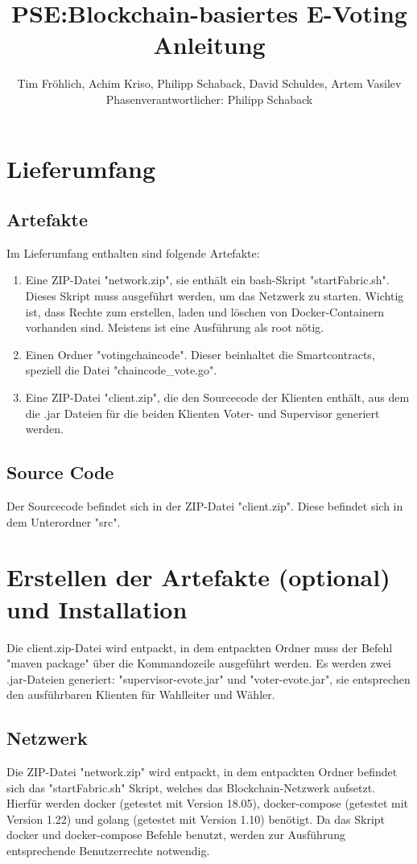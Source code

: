 \documentclass[parskip=full]{scrartcl}
\title{
	PSE:Blockchain-basiertes E-Voting \\
	Anleitung
}
\author{Tim Fröhlich, Achim Kriso, Philipp Schaback, David Schuldes, Artem Vasilev\\ Phasenverantwortlicher: Philipp Schaback}
\begin{document}
	\clearpage
	\maketitle
	\newpage
	
	\tableofcontents
	\newpage
	
	\section{Lieferumfang}
	\subsection{Artefakte}
	Im Lieferumfang enthalten sind folgende Artefakte:
	\begin{enumerate}
		\item Eine ZIP-Datei "network.zip", sie enthält ein bash-Skript "startFabric.sh". Dieses Skript muss ausgeführt werden, um das Netzwerk zu starten. Wichtig ist, dass Rechte zum erstellen, laden und löschen von Docker-Containern vorhanden sind. Meistens ist eine Ausführung als root nötig.
		\item Einen Ordner "votingchaincode". Dieser beinhaltet die Smartcontracts, speziell die Datei "chaincode\_vote.go".
		\item Eine ZIP-Datei "client.zip", die den Sourcecode der Klienten enthält, aus dem die .jar Dateien für die beiden Klienten Voter- und Supervisor generiert werden.
	\end{enumerate}

	\subsection{Source Code}
	
	Der Sourcecode befindet sich in der ZIP-Datei "client.zip". Diese befindet sich in dem Unterordner "src".
	\section{Erstellen der Artefakte (optional) und Installation}

	
	Die client.zip-Datei wird entpackt, in dem entpackten Ordner muss der Befehl "maven package" über die Kommandozeile ausgeführt werden. Es werden zwei .jar-Dateien generiert: "supervisor-evote.jar" und "voter-evote.jar", sie entsprechen den ausführbaren Klienten für Wahlleiter und Wähler.
	\subsection{Netzwerk}
	Die ZIP-Datei "network.zip" wird entpackt, in dem entpackten Ordner befindet sich das "startFabric.sh" Skript, welches das Blockchain-Netzwerk aufsetzt. Hierfür werden docker (getestet mit Version 18.05), docker-compose (getestet mit Version 1.22) und golang (getestet mit Version 1.10) benötigt.
	Da das Skript docker und docker-compose Befehle benutzt, werden zur Ausführung entsprechende Benutzerrechte notwendig.
\end{document}
